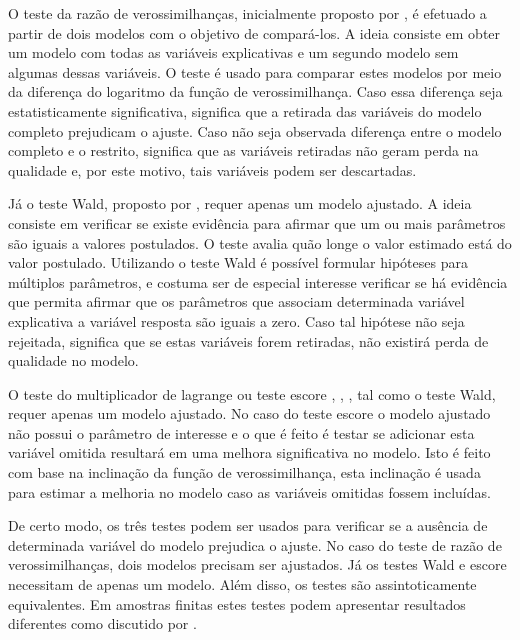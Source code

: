 O teste da razão de verossimilhanças, inicialmente proposto por \citet{trv}, é efetuado a partir de dois modelos com o objetivo de compará-los. A ideia consiste em obter um modelo com todas as variáveis explicativas e um segundo modelo sem algumas dessas variáveis. O teste é usado para comparar estes modelos por meio da diferença do logaritmo da função de verossimilhança. Caso essa diferença seja estatisticamente significativa, significa que a retirada das variáveis do modelo completo prejudicam o ajuste. Caso não seja observada diferença entre o modelo completo e o restrito, significa que as variáveis retiradas não geram perda na qualidade e, por este motivo, tais variáveis podem ser descartadas.

Já o teste Wald, proposto por \citet{wald}, requer apenas um modelo ajustado. A ideia consiste em verificar se existe evidência para afirmar que um ou mais parâmetros são iguais a valores postulados. O teste avalia quão longe o valor estimado está do valor postulado. Utilizando o teste Wald é possível formular hipóteses para múltiplos parâmetros, e costuma ser de especial interesse verificar se há evidência que permita afirmar que os parâmetros que associam determinada variável explicativa a variável resposta são iguais a zero. Caso tal hipótese não seja rejeitada, significa que se estas variáveis forem retiradas, não existirá perda de qualidade no modelo.

O teste do multiplicador de lagrange ou teste escore \citep{score1}, \citep{score2}, \citep{score3}, tal como o teste Wald, requer apenas um modelo ajustado. No caso do teste escore o modelo ajustado não possui o parâmetro de interesse e o que é feito é testar se adicionar esta variável omitida resultará em uma melhora significativa no modelo. Isto é feito com base na inclinação da função de verossimilhança, esta inclinação é usada para estimar a melhoria no modelo caso as variáveis omitidas fossem incluídas.

De certo modo, os três testes podem ser usados para verificar se a ausência de determinada variável do modelo prejudica o ajuste. No caso do teste de razão de verossimilhanças, dois modelos precisam ser ajustados. Já os testes Wald e escore necessitam de apenas um modelo. Além disso, os testes são assintoticamente equivalentes. Em amostras finitas estes testes podem apresentar resultados diferentes como discutido por \citet{conflict}.


